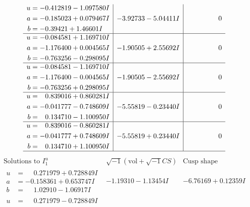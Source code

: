 \documentclass[1p]{elsarticle_modified}
\theoremstyle{definition}
\newcommand{\I}{\sqrt{-1}}
\begin{document}
$$\begin{array}{c|c|c}
\begin{aligned}
u &= -0.412819 - 1.097580 I \\
a &= -0.185023 + 0.079467 I \\
b &= -0.39421 + 1.46601 I\end{aligned}
 & -3.92733 - 5.04411 I & \phantom{-0.000000 } 0 \\ \hline\begin{aligned}
u &= -0.084581 + 1.169710 I \\
a &= -1.176400 + 0.004565 I \\
b &= -0.763256 - 0.298095 I\end{aligned}
 & -1.90505 + 2.55692 I & \phantom{-0.000000 } 0 \\ \hline\begin{aligned}
u &= -0.084581 - 1.169710 I \\
a &= -1.176400 - 0.004565 I \\
b &= -0.763256 + 0.298095 I\end{aligned}
 & -1.90505 - 2.55692 I & \phantom{-0.000000 } 0 \\ \hline\begin{aligned}
u &= \phantom{-}0.839016 + 0.860281 I \\
a &= -0.041777 - 0.748609 I \\
b &= \phantom{-}0.134710 - 1.100950 I\end{aligned}
 & -5.55819 - 0.23440 I & \phantom{-0.000000 } 0 \\ \hline\begin{aligned}
u &= \phantom{-}0.839016 - 0.860281 I \\
a &= -0.041777 + 0.748609 I \\
b &= \phantom{-}0.134710 + 1.100950 I\end{aligned}
 & -5.55819 + 0.23440 I & \phantom{-0.000000 } 0\\
 \hline 
 \end{array}$$\newpage$$\begin{array}{c|c|c}  
\text{Solutions to }I^u_{1}& \I (\text{vol} + \sqrt{-1}CS) & \text{Cusp shape}\\
 \hline 
\begin{aligned}
u &= \phantom{-}0.271979 + 0.728849 I \\
a &= -0.158361 + 0.653747 I \\
b &= \phantom{-}1.02910 - 1.06917 I\end{aligned}
 & -1.19310 - 1.13454 I & -6.76169 + 0.12359 I \\ \hline\begin{aligned}
u &= \phantom{-}0.271979 - 0.728849 I \\

\end{aligned}
\end{array}$$
\end{document}

